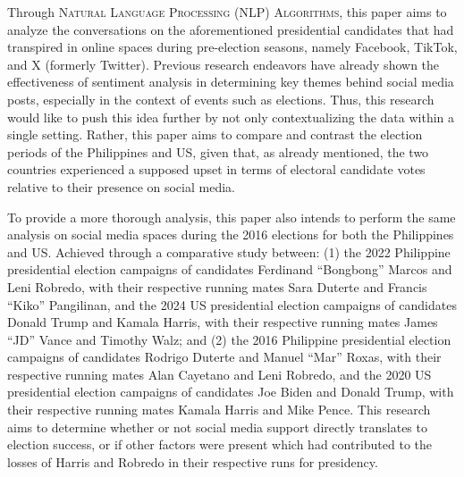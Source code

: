 Through \textsc{Natural Language Processing (NLP) Algorithms}, this paper aims to analyze the conversations on the aforementioned presidential candidates that had transpired in online spaces during pre-election seasons, namely Facebook, TikTok, and X (formerly Twitter). Previous research endeavors have already shown the effectiveness of sentiment analysis in determining key themes behind social media posts, especially in the context of events such as elections. Thus, this research would like to push this idea further by not only contextualizing the data within a single setting. Rather, this paper aims to compare and contrast the election periods of the Philippines and US, given that, as already mentioned, the two countries experienced a supposed upset in terms of electoral candidate votes relative to their presence on social media.

To provide a more thorough analysis, this paper also intends to perform the same analysis on social media spaces during the 2016 elections for both the Philippines and US. Achieved through a comparative study between: (1) the 2022 Philippine presidential election campaigns of candidates Ferdinand “Bongbong” Marcos and Leni Robredo, with their respective running mates Sara Duterte and Francis “Kiko” Pangilinan, and the 2024 US presidential election campaigns of candidates Donald Trump and Kamala Harris, with their respective running mates James “JD” Vance and Timothy Walz; and (2) the 2016 Philippine presidential election campaigns of candidates Rodrigo Duterte and Manuel “Mar” Roxas, with their respective running mates Alan Cayetano and Leni Robredo, and the 2020 US presidential election campaigns of candidates Joe Biden and Donald Trump, with their respective running mates Kamala Harris and Mike Pence.  This research aims to determine whether or not social media support directly translates to election success, or if other factors were present which had contributed to the losses of Harris and Robredo in their respective runs for presidency.
